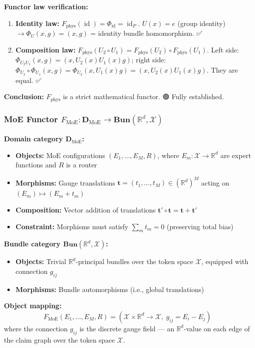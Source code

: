 \documentclass[12pt,a4paper]{article}
\theoremstyle{plain}
\theoremstyle{definition}
\newcommand{\R}{\mathbb{R}}
\DeclareMathOperator{\id}{id}
\begin{document}
\textbf{Functor law verification:}
\begin{enumerate}
    \item \textbf{Identity law:} $F_{\text{phys}}(\id) = \Phi_{\id} = \id_P$. $U(x) = e$ (group identity) $\to \Phi_U(x,g) = (x,g)$ = identity bundle homomorphism. ✅
    \item \textbf{Composition law:} $F_{\text{phys}}(U_2 \circ U_1) = F_{\text{phys}}(U_2) \circ F_{\text{phys}}(U_1)$. Left side: $\Phi_{U_2U_1}(x,g) = (x, U_2(x)U_1(x)g)$; right side: $\Phi_{U_2} \circ \Phi_{U_1}(x,g) = \Phi_{U_2}(x, U_1(x)g) = (x, U_2(x)U_1(x)g)$. They are equal. ✅
\end{enumerate}

\textbf{Conclusion:} $F_{\text{phys}}$ is a strict mathematical functor. 🟢 Fully established.

\subsubsection{MoE Functor $F_{\text{MoE}}: \mathbf{D}_{\text{MoE}} \to \mathbf{Bun}(\R^d, \mathcal{X})$}

\textbf{Domain category $\mathbf{D}_{\text{MoE}}$:}
\begin{itemize}
    \item \textbf{Objects:} MoE configurations $(E_1, \ldots, E_M, R)$, where $E_m: \mathcal{X} \to \R^d$ are expert functions and $R$ is a router
    \item \textbf{Morphisms:} Gauge translations $\mathbf{t} = (t_1, \ldots, t_M) \in (\R^d)^M$ acting on $(E_m) \mapsto (E_m + t_m)$
    \item \textbf{Composition:} Vector addition of translations $\mathbf{t}' \circ \mathbf{t} = \mathbf{t} + \mathbf{t}'$
    \item \textbf{Constraint:} Morphisms must satisfy $\sum_m t_m = 0$ (preserving total bias)
\end{itemize}

\textbf{Bundle category $\mathbf{Bun}(\R^d, \mathcal{X})$:}
\begin{itemize}
    \item \textbf{Objects:} Trivial $\R^d$-principal bundles over the token space $\mathcal{X}$, equipped with connection $g_{ij}$
    \item \textbf{Morphisms:} Bundle automorphisms (i.e., global translations)
\end{itemize}

\textbf{Object mapping:}
\begin{equation}
    F_{\text{MoE}}(E_1,\ldots,E_M, R) = (\mathcal{X} \times \R^d \to \mathcal{X}, \; g_{ij} = E_i - E_j)
\end{equation}
where the connection $g_{ij}$ is the discrete gauge field — an $\R^d$-value on each edge of the claim graph over the token space $\mathcal{X}$.
\end{document}
